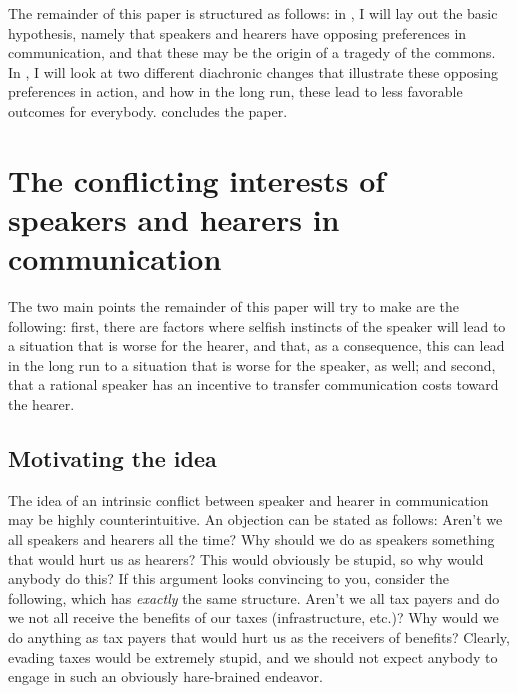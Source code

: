 \documentclass[output=paper,hidelinks]{langscibook}
\begin{document}
The remainder of this paper is structured as follows: in , I will lay out the basic hypothesis, namely that speakers and hearers have opposing preferences in communication, and that these may be the origin of a tragedy of the commons. In , I will look at two different diachronic changes that illustrate these opposing preferences in action, and how in the long run, these lead to less favorable outcomes for everybody.  concludes the paper.


\section{The conflicting interests of speakers and hearers in communication}
\label{sec:confl-betw-speak}


The two main points the remainder of this paper will try to make are the following: first, there are factors where selfish instincts of the speaker will lead to a situation that is worse for the hearer, and that, as a consequence, this can lead in the long run to a situation that is worse for the speaker, as well; and second, that a rational speaker has an incentive to transfer communication costs toward the hearer. 

\subsection{Motivating the idea}
\label{sec:motivating-idea}

The idea of an intrinsic conflict between speaker and hearer in communication may be highly counterintuitive. An objection can be stated as follows: Aren't we all speakers and hearers all the time? Why should we do as speakers something that would hurt us as hearers? This would obviously be stupid, so why would anybody do this? If this argument looks convincing to you, consider the following, which has \emph{exactly} the same structure. Aren't we all tax payers and do we not all receive the benefits of our taxes (infrastructure, etc.)? Why would we do anything as tax payers that would hurt us as the receivers of benefits? Clearly, evading taxes would be extremely stupid, and we should not expect anybody to engage in such an obviously hare-brained endeavor.
\end{document}
